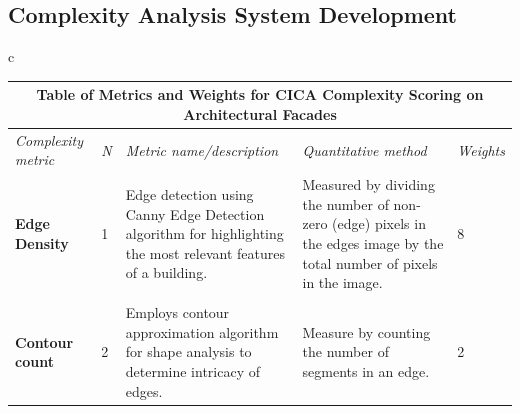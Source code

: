 \documentclass[final,5p,times]{elsarticle}%
\begin{document}
\begin{linenumbers}
    \subsection{Complexity Analysis System Development}
    \label{subsec:ComplexitySystemDevelopment}
    

    \begin{table}[htb]
    \centering
    \small
    \begin{tabular}{c}
        \begin{minipage}{\textwidth}
            \centering
            \label{tab:MetricsandWeights}
            \begin{tabularx}{\textwidth}{p{2.5cm} p{1cm} X X p{1cm}}
                \toprule
                \multicolumn{5}{c}{\textbf{Table of Metrics and Weights for CICA Complexity Scoring on Architectural Facades}} \\
                \toprule
                \textit{Complexity metric} &
                  \textit{N} &
                  \textit{Metric name/description} &
                  \textit{Quantitative   method} &
                  \textit{Weights} \\ \midrule
                \textbf{Edge Density} &
                  1 &
                  Edge detection using Canny Edge Detection algorithm for highlighting the most relevant features of a building.
                    &
                  Measured by dividing the number of non-zero (edge) pixels in the edges image by the total number of pixels in the image.
                    &
                  8\\
                \\
                \textbf{Contour count} &
                  2 &
                  Employs contour approximation algorithm for shape analysis to determine intricacy of edges.
                    &
                  Measure by counting the number of segments in an edge.
                    &
                  2\\ \bottomrule

\end{tabularx}
\end{minipage}
\end{tabular}
\end{table}
\end{linenumbers}
\end{document}
